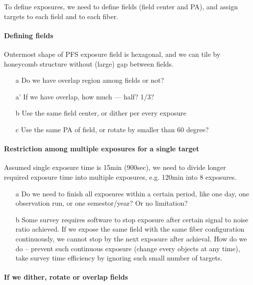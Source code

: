 \documentclass[a4paper,notitlepage]{article}
\newcommand{\colm}[1]{\textcolor{ccolm}{#1}}
\newcommand{\coll}[1]{\textcolor{ccoll}{#1}}
\begin{document}
To define exposures, we need to define fields (field center and PA), and 
assign targets to each field and to each fiber. 

\paragraph{Defining fields}

Outermost shape of PFS exposure field is hexagonal, and we can tile by 
honeycomb structure without (large) gap between fields. 

\begin{enumerate}
  \item[\colm{a}] Do we have overlap region among fields or not?
  \item[\colm{a'}] If we have overlap, how much --- half? 1/3?
  \item[\colm{b}] Use the same field center, or dither per every exposure
  \item[\colm{c}] Use the same PA of field, or rotate by smaller than 60 degree?
\end{enumerate}


\paragraph{Restriction among multiple exposures for a single target}

Assumed single exposure time is 15min (900sec), we need to divide longer 
required exposure time into multiple exposures, e.g. 120min into 8 exposures. 

\begin{enumerate}
  \item[\coll{a}] Do we need to finish all exposures within a certain period, like 
    one day, one observation run, or one semestor/year? Or no limitation? 
  \item[\colm{b}] Some survey requires software to stop exposure after certain 
    signal to noise ratio achieved. 
    If we expose the same field with the same fiber configuration
    continuously, we cannot stop by the next exposure after achieval. 
    How do we do -- prevent such continuous exposure (change every objects 
    at any time), take survey time efficiency by ignoring such small number of 
    targets.
\end{enumerate}


\paragraph{If we dither, rotate or overlap fields}
\end{document}
